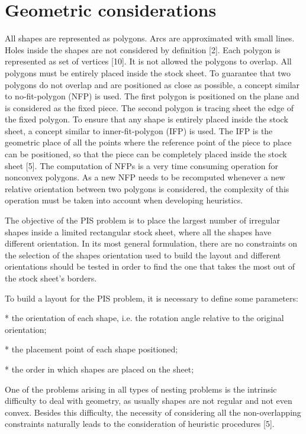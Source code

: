 \documentclass{llncs}
\begin{document}
\section{Geometric considerations}
%
All shapes are represented as polygons. Arcs are approximated with small lines. Holes inside the shapes are not considered by definition [2]. Each polygon is represented as set of vertices [10]. It is not allowed the polygons to overlap. All polygons must be entirely placed inside the stock sheet. To guarantee that two polygons do not overlap and are positioned as close as possible, a concept similar to no-fit-polygon (NFP) is used. The first polygon is positioned on the plane and is considered as the fixed piece. The second polygon is tracing sheet the edge of the fixed polygon. To ensure that any shape is entirely placed inside the stock sheet, a concept similar to inner-fit-polygon (IFP) is used. The IFP is the geometric place of all the points where the reference point of the piece to place can be positioned, so that the piece can be completely placed inside the stock sheet [5]. The computation of NFPs is a very time consuming operation for nonconvex polygons. As a new NFP needs to be recomputed whenever a new relative orientation between two polygons is considered, the complexity of this operation must be taken into account when developing heuristics.

The objective of the PIS problem is to place the largest number of irregular shapes inside a limited rectangular stock sheet, where all the shapes have different orientation. In its most general formulation, there are no constraints on the selection of the shapes orientation used to build the layout and different orientations should be tested in order to find the one that takes the most out of the stock sheet’s borders.

To build a layout for the PIS problem, it is necessary to define some parameters:

* the orientation of each shape, i.e. the rotation angle relative to the original orientation;

* the placement point of each shape positioned;

* the order in which shapes are placed on the sheet;

One of the problems arising in all types of nesting problems is the intrinsic difficulty to deal with geometry, as usually shapes are not regular and not even convex. Besides this difficulty, the necessity of considering all the non-overlapping constraints naturally leads to the consideration of heuristic procedures [5]. 
%
\end{document}
